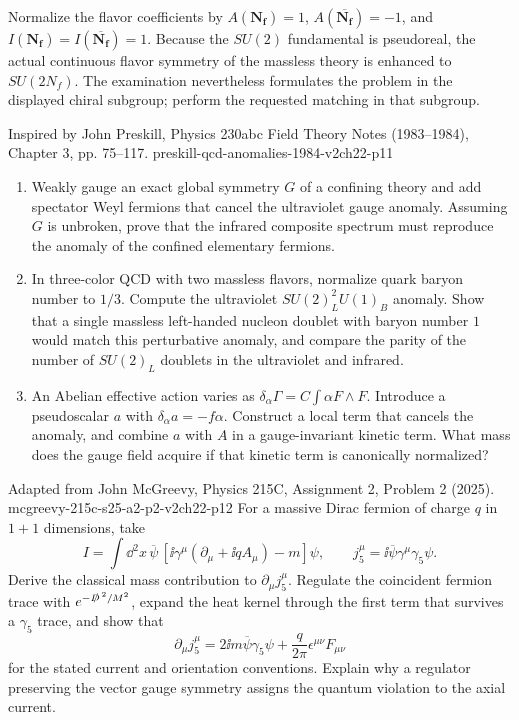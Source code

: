 \begin{enumerate}
  Normalize the flavor coefficients by
  \(A(\mathbf{N_f})=1\),
  \(A(\overline{\mathbf{N_f}})=-1\), and
  \(I(\mathbf{N_f})=I(\overline{\mathbf{N_f}})=1\).
  Because the \(SU(2)\) fundamental is pseudoreal, the actual continuous
  flavor symmetry of the massless theory is enhanced to \(SU(2N_f)\).
  The examination nevertheless formulates the problem in the displayed
  chiral subgroup; perform the requested matching in that subgroup.

  {Inspired by John Preskill, Physics 230abc Field Theory Notes
  (1983--1984), Chapter 3, pp. 75--117.}
  {preskill-qcd-anomalies-1984-v2ch22-p11}
  \begin{enumerate}
    \item[(a)]
    Weakly gauge an exact global symmetry \(G\) of a confining theory and
    add spectator Weyl fermions that cancel the ultraviolet gauge anomaly.
    Assuming \(G\) is unbroken, prove that the infrared composite spectrum
    must reproduce the anomaly of the confined elementary fermions.
    \item[(b)]
    In three-color QCD with two massless flavors, normalize quark baryon
    number to \(1/3\).  Compute the ultraviolet
    \(SU(2)_L^2U(1)_B\) anomaly.  Show that a single massless
    left-handed nucleon doublet with baryon number \(1\) would match this
    perturbative anomaly, and compare the parity of the number of
    \(SU(2)_L\) doublets in the ultraviolet and infrared.
    \item[(c)]
    An Abelian effective action varies as
    \(\delta_\alpha\Gamma=C\int\alpha F\wedge F\).
    Introduce a pseudoscalar \(a\) with
    \(\delta_\alpha a=-f\alpha\).  Construct a local term that cancels
    the anomaly, and combine \(a\) with \(A\) in a gauge-invariant kinetic
    term.  What mass does the gauge field acquire if that kinetic term is
    canonically normalized?
  \end{enumerate}

  {Adapted from John McGreevy, Physics 215C, Assignment 2, Problem 2 (2025).}
  {mcgreevy-215c-s25-a2-p2-v2ch22-p12}
  For a massive Dirac fermion of charge \(q\) in \(1+1\) dimensions, take
  \[
    I=\int \dd^2x\,
      \overline\psi\,[\ii\gamma^\mu(\partial_\mu+\ii qA_\mu)-m]\psi,
    \qquad
    j_5^\mu=\ii\overline\psi\gamma^\mu\gamma_5\psi .
  \]
  Derive the classical mass contribution to
  \(\partial_\mu j_5^\mu\).  Regulate the coincident fermion trace with
  \(e^{-\slashed D^{\,2}/M^2}\), expand the heat kernel through the first
  term that survives a \(\gamma_5\) trace, and show that
  \[
    \partial_\mu j_5^\mu
      =2\ii m\overline\psi\gamma_5\psi
       +\frac{q}{2\pi}\epsilon^{\mu\nu}F_{\mu\nu}
  \]
  for the stated current and orientation conventions.  Explain why a
  regulator preserving the vector gauge symmetry assigns the quantum
  violation to the axial current.

\end{enumerate}

